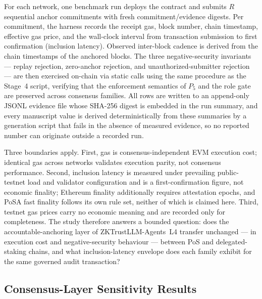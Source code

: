 For each network, one benchmark run deploys the contract and submits $R$
sequential anchor commitments with fresh commitment/evidence digests. Per
commitment, the harness records the receipt gas, block number, chain
timestamp, effective gas price, and the wall-clock interval from
transaction submission to first confirmation (inclusion latency). Observed
inter-block cadence is derived from the chain timestamps of the anchored
blocks. The three negative-security invariants --- replay rejection,
zero-anchor rejection, and unauthorized-submitter rejection --- are then
exercised on-chain via static calls using the same procedure as the
Stage~4 script, verifying that the enforcement semantics of
$P_5$ and the role gate are preserved across consensus families. All rows
are written to an append-only JSONL evidence file whose SHA-256 digest is
embedded in the run summary, and every manuscript value is derived
deterministically from these summaries by a generation script that fails
in the absence of measured evidence, so no reported number can originate
outside a recorded run.

Three boundaries apply. First, gas is consensus-independent EVM execution
cost; identical gas across networks validates execution parity, not
consensus performance. Second, inclusion latency is measured under
prevailing public-testnet load and validator configuration and is a
first-confirmation figure, not economic finality; Ethereum finality
additionally requires attestation epochs, and PoSA fast finality follows
its own rule set, neither of which is claimed here. Third, testnet gas
prices carry no economic meaning and are recorded only for completeness.
The study therefore answers a bounded question: does the accountable-anchoring
layer of ZKTrustLLM-Agents~L4 transfer unchanged --- in execution cost and
negative-security behaviour --- between PoS and delegated-staking chains,
and what inclusion-latency envelope does each family exhibit for the same
governed audit transaction?

\subsection{Consensus-Layer Sensitivity Results}
\label{sec:consensus-results}

